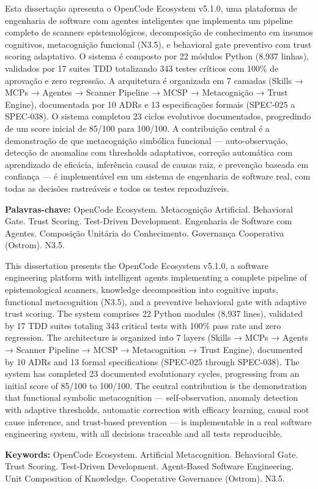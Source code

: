 \documentclass[12pt,a4paper,oneside]{abntex2}
\begin{document}
\begin{resumo}
Esta dissertação apresenta o OpenCode Ecosystem v5.1.0, uma plataforma de engenharia de software com agentes inteligentes que implementa um pipeline completo de scanners epistemológicos, decomposição de conhecimento em insumos cognitivos, metacognição funcional (N3.5), e behavioral gate preventivo com trust scoring adaptativo. O sistema é composto por 22 módulos Python (8.937 linhas), validados por 17 suites TDD totalizando 343 testes críticos com 100\% de aprovação e zero regressão. A arquitetura é organizada em 7 camadas (Skills → MCPs → Agentes → Scanner Pipeline → MCSP → Metacognição → Trust Engine), documentada por 10 ADRs e 13 especificações formais (SPEC-025 a SPEC-038). O sistema completou 23 ciclos evolutivos documentados, progredindo de um score inicial de 85/100 para 100/100. A contribuição central é a demonstração de que metacognição simbólica funcional — auto-observação, detecção de anomalias com thresholds adaptativos, correção automática com aprendizado de eficácia, inferência causal de causas raiz, e prevenção baseada em confiança — é implementável em um sistema de engenharia de software real, com todas as decisões rastreáveis e todos os testes reproduzíveis.

\textbf{Palavras-chave:} OpenCode Ecosystem. Metacognição Artificial. Behavioral Gate. Trust Scoring. Test-Driven Development. Engenharia de Software com Agentes. Composição Unitária do Conhecimento. Governança Cooperativa (Ostrom). N3.5.
\end{resumo}

\begin{resumo}[Abstract]
This dissertation presents the OpenCode Ecosystem v5.1.0, a software engineering platform with intelligent agents implementing a complete pipeline of epistemological scanners, knowledge decomposition into cognitive inputs, functional metacognition (N3.5), and a preventive behavioral gate with adaptive trust scoring. The system comprises 22 Python modules (8,937 lines), validated by 17 TDD suites totaling 343 critical tests with 100\% pass rate and zero regression. The architecture is organized into 7 layers (Skills → MCPs → Agents → Scanner Pipeline → MCSP → Metacognition → Trust Engine), documented by 10 ADRs and 13 formal specifications (SPEC-025 through SPEC-038). The system has completed 23 documented evolutionary cycles, progressing from an initial score of 85/100 to 100/100. The central contribution is the demonstration that functional symbolic metacognition — self-observation, anomaly detection with adaptive thresholds, automatic correction with efficacy learning, causal root cause inference, and trust-based prevention — is implementable in a real software engineering system, with all decisions traceable and all tests reproducible.

\textbf{Keywords:} OpenCode Ecosystem. Artificial Metacognition. Behavioral Gate. Trust Scoring. Test-Driven Development. Agent-Based Software Engineering. Unit Composition of Knowledge. Cooperative Governance (Ostrom). N3.5.
\end{resumo}
\end{document}
